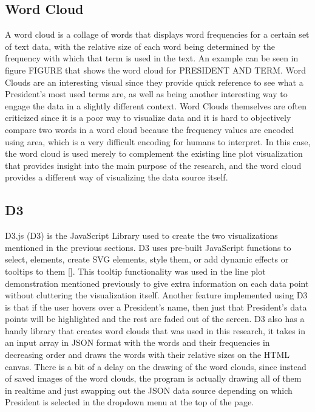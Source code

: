 \subsection{Word Cloud}
A word cloud is a collage of words that displays word frequencies for a certain set of text data, with the relative size of each word being determined by the frequency with which that term is used in the text.
An example can be seen in figure FIGURE that shows the word cloud for PRESIDENT AND TERM.
Word Clouds are an interesting visual since they provide quick reference to see what a President's most used terms are, as well as being another interesting way to engage the data in a slightly different context.
Word Clouds themselves are often criticized since it is a poor way to visualize data and it is hard to objectively compare two words in a word cloud because the frequency values are encoded using area, which is a very difficult encoding for humans to interpret.
In this case, the word cloud is used merely to complement the existing line plot visualization that provides insight into the main purpose of the research, and the word cloud provides a different way of visualizing the data source itself.

\subsection{D3}
D3.js (D3) is the JavaScript Library used to create the two visualizations mentioned in the previous sections.
D3 uses pre-built JavaScript functions to select, elements, create SVG elements, style them, or add dynamic effects or tooltips to them [\cite{bostock2011d3}].
This tooltip functionality was used in the line plot demonstration mentioned previously to give extra information on each data point without cluttering the visualization itself.
Another feature implemented using D3 is that if the user hovers over a President's name, then just that President's data points will be highlighted and the rest are faded out of the screen.
D3 also has a handy library that creates word clouds that was used in this research, it takes in an input array in JSON format with the words and their frequencies in decreasing order and draws the words with their relative sizes on the HTML canvas.
There is a bit of a delay on the drawing of the word clouds, since instead of saved images of the word clouds, the program is actually drawing all of them in realtime and just swapping out the JSON data source depending on which President is selected in the dropdown menu at the top of the page.

